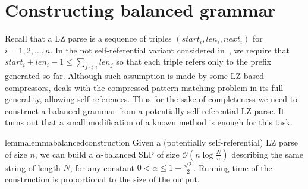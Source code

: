 \documentclass[runningheads]{llncs}
\begin{document}
\section{Constructing balanced grammar}\label{section:constructing}

Recall that a LZ parse is a sequence of triples $(start_i,len_i,next_i)$ for $i=1,2,\ldots,n$. In the not self-referential variant considered in~\cite{CharikarApproximation}, we require that $start_i+len_i-1\leq\sum_{j<i}len_j$ so that each triple refers only to the prefix generated so far. Although such assumption is made by some LZ-based compressors, \cite{Farach} deals with the compressed pattern matching problem in its full generality, allowing self-references. Thus for the sake of completeness we need to construct a balanced grammar from a potentially self-referential LZ parse. It turns out that a small modification of a known method is enough for this task.

\begin{restatable}{lemma}{lemmabalancedconstruction}
\label{lemma:balanced construction}
Given a (potentially self-referential) LZ parse of size $n$, we can build a $\alpha$-balanced SLP of size $\mathcal{O}(n\log\frac{N}{n})$ describing the same string of length $N$, for any constant $0<\alpha\leq 1-\frac{\sqrt{2}}{2}$. Running time of the construction is proportional to the size of the output.
\end{restatable}
\end{document}
